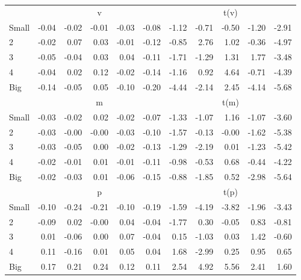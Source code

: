 \begin{table}[!ht]
\begin{tabular}{lrrrrrrrrrr}
  
     & \multicolumn{5}{c}{v} & \multicolumn{5}{c}{t(v)}   \\
     \cmidrule(r){2-6} \cmidrule(r){7-11} 
    Small  & -0.04  & -0.02  & -0.01  & -0.03  & -0.08  & -1.12  & -0.71  & -0.50  & -1.20  & -2.91   \\
    2  & -0.02  & 0.07  & 0.03  & -0.01  & -0.12  & -0.85  & 2.76  & 1.02  & -0.36  & -4.97   \\
    3  & -0.05  & -0.04  & 0.03  & 0.04  & -0.11  & -1.71  & -1.29  & 1.31  & 1.77  & -3.48   \\
    4  & -0.04  & 0.02  & 0.12  & -0.02  & -0.14  & -1.16  & 0.92  & 4.64  & -0.71  & -4.39   \\
    Big  & -0.14  & -0.05  & 0.05  & -0.10  & -0.20  & -4.44  & -2.14  & 2.45  & -4.14  & -5.68   \\
    
  
     & \multicolumn{5}{c}{m} & \multicolumn{5}{c}{t(m)}   \\
     \cmidrule(r){2-6} \cmidrule(r){7-11} 
    Small  & -0.03  & -0.02  & 0.02  & -0.02  & -0.07  & -1.33  & -1.07  & 1.16  & -1.07  & -3.60   \\
    2  & -0.03  & -0.00  & -0.00  & -0.03  & -0.10  & -1.57  & -0.13  & -0.00  & -1.62  & -5.38   \\
    3  & -0.03  & -0.05  & 0.00  & -0.02  & -0.13  & -1.29  & -2.19  & 0.01  & -1.23  & -5.42   \\
    4  & -0.02  & -0.01  & 0.01  & -0.01  & -0.11  & -0.98  & -0.53  & 0.68  & -0.44  & -4.22   \\
    Big  & -0.02  & -0.03  & 0.01  & -0.06  & -0.15  & -0.88  & -1.85  & 0.52  & -2.98  & -5.64   \\
    
  
     & \multicolumn{5}{c}{p} & \multicolumn{5}{c}{t(p)}   \\
     \cmidrule(r){2-6} \cmidrule(r){7-11} 
    Small  & -0.10  & -0.24  & -0.21  & -0.10  & -0.19  & -1.59  & -4.19  & -3.82  & -1.96  & -3.43   \\
    2  & -0.09  & 0.02  & -0.00  & 0.04  & -0.04  & -1.77  & 0.30  & -0.05  & 0.83  & -0.81   \\
    3  & 0.01  & -0.06  & 0.00  & 0.07  & -0.04  & 0.15  & -1.03  & 0.03  & 1.42  & -0.60   \\
    4  & 0.11  & -0.16  & 0.01  & 0.05  & 0.04  & 1.68  & -2.99  & 0.25  & 0.95  & 0.65   \\
    Big  & 0.17  & 0.21  & 0.24  & 0.12  & 0.11  & 2.54  & 4.92  & 5.56  & 2.41  & 1.60   \\
    
  
  \bottomrule
\end{tabular}
\label{tbl:25_Size_Acc_B16}
\end{table}